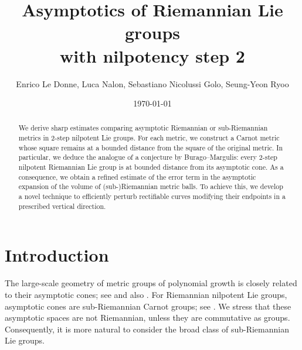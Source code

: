 \documentclass[a4paper,11pt,reqno]{amsart}
\author[E. Le Donne, L. Nalon, S. Nicolussi Golo, S. Ryoo]{Enrico Le Donne, Luca Nalon, Sebastiano Nicolussi Golo,
Seung-Yeon Ryoo}
\date{\today}
\theoremstyle{plain}
\theoremstyle{definition}
\begin{document}
	
	\title[Asymptotics of step-2 nilpotent Lie groups]{Asymptotics of Riemannian Lie groups \\ with nilpotency step 2}
	
	\begin{abstract} We derive sharp estimates comparing asymptotic Riemannian or sub-Riemannian metrics in 2-step nilpotent Lie groups. For each metric, we construct a Carnot metric whose square remains at a bounded distance from the square of the original metric. 
 In particular, we deduce the analogue of a conjecture by Burago--Margulis: every 2-step nilpotent Riemannian Lie group is at bounded distance from its asymptotic cone.
 As a consequence, we obtain a refined estimate of the error term in the asymptotic expansion of the volume of (sub-)Riemannian metric balls. To achieve this, we develop a novel technique to efficiently perturb rectifiable curves modifying their endpoints in a prescribed vertical direction.
	\end{abstract}
	\maketitle
	\tableofcontents
	
	\section{Introduction}
 The large-scale geometry of metric groups of polynomial growth is closely related to their asymptotic cones; see \cite{MR623534} and also \cite{MR3267520}. 
 For Riemannian nilpotent Lie groups, asymptotic cones are sub-Riemannian Carnot groups; see \cite{donne2024metricliegroupscarnotcaratheodory, MR741395}.
 We stress that these asymptotic spaces are not Riemannian, unless they are commutative as groups.
 Consequently, it is more natural to consider the broad class of sub-Riemannian Lie groups.
 
\end{document}
